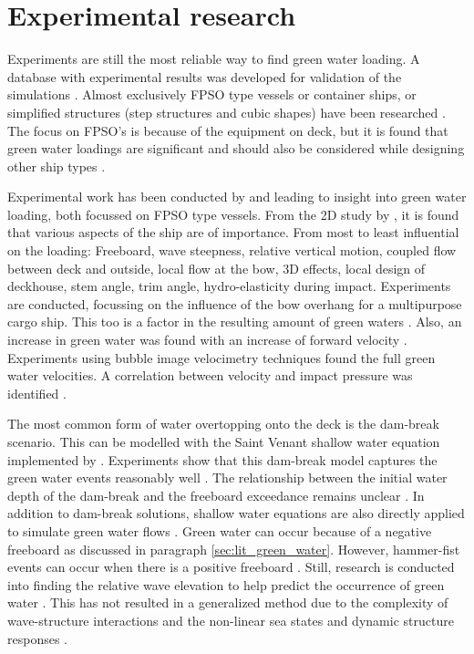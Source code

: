 \section{Experimental research}
\label{sec:lit_exp_green_water} 
Experiments are still the most reliable way to find green water loading. A database with experimental results was developed for validation of the simulations \cite{Lee2012}.  Almost exclusively FPSO type vessels or container ships, or simplified structures (step structures and cubic shapes) have been researched \cite{Chuang2019}. The focus on FPSO's is because of the equipment on deck, but it is found that green water loadings are significant and should also be considered while designing other ship types \cite{Kudupudi2019}. \par 
Experimental work has been conducted by \citet{Buchner2002} and \citet{Greco2001} leading to insight into green water loading, both focussed on FPSO type vessels. From the 2D study by \citet{Greco2001}, it is found that various aspects of the ship are of importance. From most to least influential on the loading: Freeboard, wave steepness, relative vertical motion, coupled flow between deck and outside, local flow at the bow, 3D effects, local design of deckhouse, stem angle, trim angle, hydro-elasticity during impact.  Experiments are conducted, focussing on the influence of the bow overhang for a multipurpose cargo ship. This too is a factor in the resulting amount of green waters \cite{Benmansour2016}. Also, an increase in green water was found with an increase of forward velocity \cite{Greco2012}. Experiments using bubble image velocimetry techniques found the full green water velocities. A correlation between velocity and impact pressure was identified \cite{Song2015}. \par  
The most common form of water overtopping onto the deck is the dam-break scenario. This can be modelled with the Saint Venant shallow water equation implemented by \citet{Ritter1892}. Experiments show that this dam-break model captures the green water events reasonably well \cite{Ryu2007, Chuang2018}. The relationship between the initial water depth of the dam-break and the freeboard exceedance remains unclear \cite{Chuang2019}. In addition to dam-break solutions, shallow water equations are also directly applied to simulate green water flows \cite{Greco2012, Liut2013}. Green water can occur because of a negative freeboard as discussed in paragraph \ref{sec:lit_green_water}. However, hammer-fist events can occur when there is a positive freeboard \cite{Greco2001}. Still, research is conducted into finding the relative wave elevation to help predict the occurrence of green water \cite{Buchner1995, Soares2005, Mori2003, Cox2001}. This has not resulted in a generalized method due to the complexity of wave-structure interactions and the non-linear sea states and dynamic structure responses \cite{Chuang2019}. \par 
